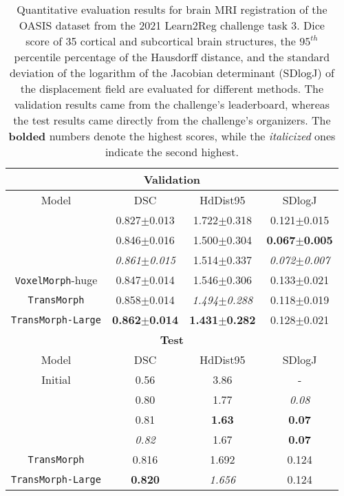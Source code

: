 \documentclass[times,twocolumn,final]{elsarticle}
\begin{document}
\begin{table}[!t]
\fontsize{8}{9.5}\selectfont
\parbox{\linewidth}{
\centering
\caption{Quantitative evaluation results for brain MRI registration of the OASIS dataset from the 2021 Learn2Reg challenge task 3. Dice score of 35 cortical and subcortical brain structures, the $95^{th}$ percentile percentage of the Hausdorff distance, and the standard deviation of the logarithm of the Jacobian determinant (SDlogJ) of the displacement field are evaluated for different methods. The validation results came from the challenge's leaderboard, whereas the test results came directly from the challenge's organizers. The \textbf{bolded} numbers denote the highest scores, while the \textit{italicized} ones indicate the second highest.}
\label{tab:table_res_OASIS}

\begin{tabular}{ c | c | c | c }
\hline
 \multicolumn{4}{c}{\textbf{Validation}}\\
 \hline
 Model & DSC & HdDist95 & SDlogJ\\
 \hline
 \cite{lv2022joint} & 0.827$\pm$0.013 & 1.722$\pm$0.318 & 0.121$\pm$0.015\\
 \hline
 \cite{siebert2021fast} &  0.846$\pm$0.016 & 1.500$\pm$0.304 & \textbf{0.067$\pm$0.005} \\
 \hline
 \cite{mok2021conditional} & \textit{0.861$\pm$0.015} & 1.514$\pm$0.337 & \textit{0.072$\pm$0.007}\\
 \hline
 \texttt{VoxelMorph}-huge & 0.847$\pm$0.014& 1.546$\pm$0.306 & 0.133$\pm$0.021\\
 \hline
 \texttt{TransMorph} & 0.858$\pm$0.014 & \textit{1.494$\pm$0.288} & 0.118$\pm$0.019 \\
 \hline
 \texttt{TransMorph-Large} & \textbf{0.862$\pm$0.014} & \textbf{1.431$\pm$0.282} & 0.128$\pm$0.021 \\
 \hline
 \hline
 \multicolumn{4}{c}{\textbf{Test}}\\
 \hline
 Model & DSC & HdDist95 & SDlogJ\\
 \hline
 Initial & 0.56 & 3.86 & -\\
 \hline
 \cite{lv2022joint} & 0.80 & 1.77 & \textit{0.08}\\
 \hline
 \cite{siebert2021fast} & 0.81 & \textbf{1.63} & \textbf{0.07}\\
 \hline
 \cite{mok2021conditional} & \textit{0.82}  & 1.67 & \textbf{0.07} \\
 \hline
 \texttt{TransMorph} & 0.816 & 1.692 & 0.124\\
 \hline
 \texttt{TransMorph-Large} & \textbf{0.820} & \textit{1.656} & 0.124 \\
 \hline
\end{tabular}}
\end{table}
\end{document}
